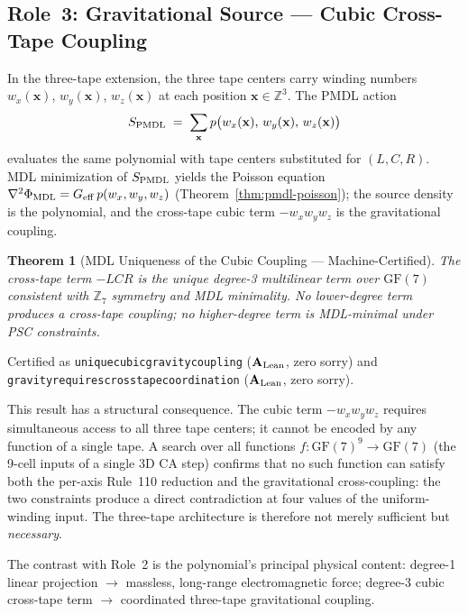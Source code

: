 \documentclass[11pt]{article}
\newtheorem{theorem}{Theorem}[section]
\theoremstyle{remark}
\newcommand{\PHIMDL}{\Phi_{\mathrm{MDL}}}
\newcommand{\ZS}{\mathbb{Z}_7}
\newcommand{\lean}[1]{%
  \penalty-100
  \begingroup\def\_{\textunderscore\allowbreak}\texttt{#1}\endgroup}
\newcommand{\CatAL}{\ensuremath{\textbf{A}_{\rm Lean}}}
\newcommand{\PMDL}{S_{\rm PMDL}}
\newcommand{\FF}{\mathrm{GF}}
\begin{document}
\subsection{Role~3: Gravitational Source --- Cubic Cross-Tape Coupling}
\label{sec:role-gravity}

In the three-tape extension, the three tape centers carry winding
numbers $w_x(\mathbf{x})$, $w_y(\mathbf{x})$, $w_z(\mathbf{x})$ at
each position $\mathbf{x} \in \mathbb{Z}^3$.  The PMDL action
\[
  \PMDL \;=\; \sum_{\mathbf{x}}
  p\bigl(w_x(\mathbf{x}),\, w_y(\mathbf{x}),\, w_z(\mathbf{x})\bigr)
\]
evaluates the same polynomial with tape centers substituted for
$(L,C,R)$.  MDL minimization of $\PMDL$ yields the Poisson equation
$\nabla^2\PHIMDL = G_{\rm eff}\,p(w_x,w_y,w_z)$
(Theorem~\ref{thm:pmdl-poisson}); the source density is the
polynomial, and the cross-tape cubic term $-w_x w_y w_z$ is the
gravitational coupling.

\begin{theorem}[MDL Uniqueness of the Cubic Coupling --- Machine-Certified]
\label{thm:cubic-unique}
The cross-tape term $-LCR$ is the unique degree-3 multilinear term
over $\FF(7)$ consistent with $\ZS$ symmetry and MDL minimality.
No lower-degree term produces a cross-tape coupling; no higher-degree
term is MDL-minimal under PSC constraints.
\end{theorem}
Certified as \lean{unique\_cubic\_gravity\_coupling} ($\CatAL$, zero
sorry) and
\lean{gravity\_requires\_cross\_tape\_coordination}
($\CatAL$, zero sorry).

This result has a structural consequence.  The cubic term $-w_x w_y
w_z$ requires simultaneous access to all three tape centers; it
cannot be encoded by any function of a single tape.  A search over
all functions $f:\FF(7)^9\to\FF(7)$ (the 9-cell inputs of a single
3D CA step) confirms that no such function can satisfy both the
per-axis Rule~110 reduction and the gravitational cross-coupling: the
two constraints produce a direct contradiction at four values of the
uniform-winding input.  The three-tape
architecture is therefore not merely sufficient but \emph{necessary}.

The contrast with Role~2 is the polynomial's principal physical
content: degree-1 linear projection $\to$ massless, long-range
electromagnetic force; degree-3 cubic cross-tape term $\to$
coordinated three-tape gravitational coupling.

\end{document}
